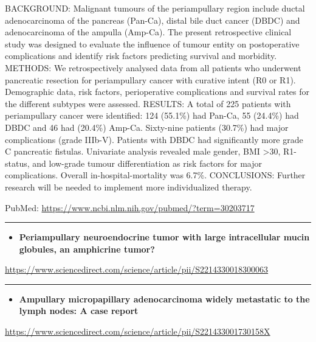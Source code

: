 \documentclass[]{article}
\providecommand{\tightlist}{%
  \setlength{\itemsep}{0pt}\setlength{\parskip}{0pt}}
\begin{document}
BACKGROUND: Malignant tumours of the periampullary region include ductal
adenocarcinoma of the pancreas (Pan-Ca), distal bile duct cancer (DBDC)
and adenocarcinoma of the ampulla (Amp-Ca). The present retrospective
clinical study was designed to evaluate the influence of tumour entity
on postoperative complications and identify risk factors predicting
survival and morbidity. METHODS: We retrospectively analysed data from
all patients who underwent pancreatic resection for periampullary cancer
with curative intent (R0 or R1). Demographic data, risk factors,
perioperative complications and survival rates for the different
subtypes were assessed. RESULTS: A total of 225 patients with
periampullary cancer were identified: 124 (55.1\%) had Pan-Ca, 55
(24.4\%) had DBDC and 46 had (20.4\%) Amp-Ca. Sixty-nine patients
(30.7\%) had major complications (grade IIIb-V). Patients with DBDC had
significantly more grade C pancreatic fistulas. Univariate analysis
revealed male gender, BMI \textgreater{}30, R1-status, and low-grade
tumour differentiation as risk factors for major complications. Overall
in-hospital-mortality was 6.7\%. CONCLUSIONS: Further research will be
needed to implement more individualized therapy.

PubMed: \url{https://www.ncbi.nlm.nih.gov/pubmed/?term=30203717}

{}

{}

\begin{center}\rule{0.5\linewidth}{\linethickness}\end{center}

\begin{itemize}
\tightlist
\item
  \textbf{Periampullary neuroendocrine tumor with large intracellular
  mucin globules, an amphicrine tumor?}
\end{itemize}

\url{https://www.sciencedirect.com/science/article/pii/S2214330018300063}

\begin{center}\rule{0.5\linewidth}{\linethickness}\end{center}

\begin{itemize}
\tightlist
\item
  \textbf{Ampullary micropapillary adenocarcinoma widely metastatic to
  the lymph nodes: A case report}
\end{itemize}

\url{https://www.sciencedirect.com/science/article/pii/S221433001730158X}
\end{document}
